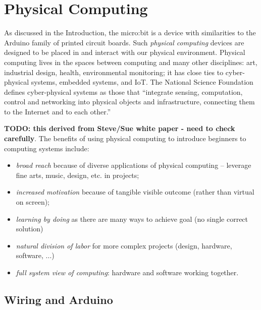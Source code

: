 \section{Physical Computing}
\label{sec:physical}

As discussed in the Introduction, the micro:bit is a device
with similarities to the Arduino family of printed 
circuit boards. Such {\em physical computing} devices
are designed to be placed in and interact with our physical environment. 
Physical computing lives in the spaces between computing and many other disciplines:
art, industrial design, health, environmental monitoring; it has
close ties to cyber-physical systems, embedded systems, and IoT. The National
Science Foundation
defines cyber-physical systems as those that ``integrate sensing, computation, 
control and networking into physical objects and infrastructure, 
connecting them to the Internet and to each other.''\cite{NSF}


%

{\bf TODO: this derived from Steve/Sue white paper - need to check carefully}.
The benefits of using physical computing to introduce beginners to computing systems include:
\begin{itemize}
\item {\em broad reach} because of diverse applications of physical computing -- leverage fine arts, music, design, etc. in projects;
\item {\em increased motivation} because of tangible visible outcome (rather than virtual on screen);
\item {\em learning by doing} as there are many ways to achieve goal (no single correct solution)
\item {\em natural division of labor} for more complex projects (design, hardware, software, ...)
\item {\em full system view of computing}: hardware and software working together.
\end{itemize}

\subsection{Wiring and Arduino}


